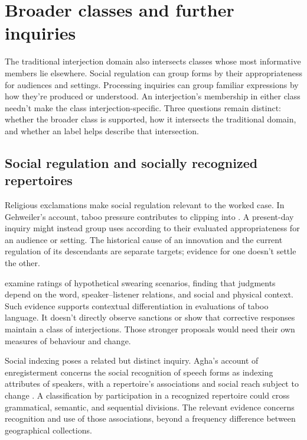 \documentclass[12pt]{article}
\begin{document}
\section{Broader classes and further inquiries}\label{sec:extensions}

The traditional interjection domain also intersects classes whose most
informative members lie elsewhere. Social regulation can group forms
by their appropriateness for audiences and settings. Processing inquiries
can group familiar expressions by how they're produced or understood.
An interjection's membership in either class needn't make the class
interjection-specific. Three questions remain distinct: whether the
broader class is supported, how it intersects the traditional domain,
and whether an  label helps describe that intersection.

\subsection{Social regulation and socially recognized repertoires}

Religious exclamations make social regulation relevant to the worked
case. In Gehweiler's account, taboo pressure contributes to clipping
 into . A present-day inquiry might instead
group uses according to their evaluated appropriateness for an audience
or setting. The historical cause of an innovation and the current
regulation of its descendants are separate targets; evidence for one
doesn't settle the other.

\textcite{jayjanschewitz2008} examine ratings of hypothetical swearing scenarios,
finding that judgments depend on the word, speaker--listener relations,
and social and physical context. Such evidence
supports contextual differentiation in evaluations of taboo language.
It doesn't directly observe sanctions or show that corrective responses
maintain a class of interjections. Those stronger proposals would need
their own measures of behaviour and change.

Social indexing poses a related but distinct inquiry. Agha's account
of enregisterment concerns the social recognition of speech forms as
indexing attributes of speakers, with a repertoire's associations and
social reach subject to change \citep[38--40]{agha2005}. A classification
by participation in a recognized repertoire could cross grammatical,
semantic, and sequential divisions. The relevant evidence concerns
recognition and use of those associations, beyond a frequency difference
between geographical collections.
\end{document}
